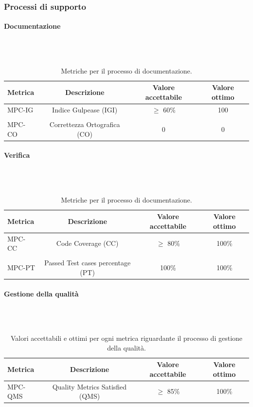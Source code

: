 \documentclass[8pt]{article}
\newcommand{\subsubsubsection}[1]{\paragraph{#1}\mbox{}\\\\}
\begin{document}
\subsubsection{Processi di supporto}
\subsubsubsection{Documentazione}
\begin{table}[h]	
	\centering
	\begin{tabular}{lccc}
		\toprule
		\textbf{Metrica}& \textbf{Descrizione} & \textbf{Valore accettabile} & \textbf{Valore ottimo} \\
		\midrule
		MPC-IG & Indice Gulpease (IGI) & $\geq$ 60\% & 100 \\\\
		MPC-CO & Correttezza Ortografica (CO) & 0 & 0 \\
		\bottomrule
	\end{tabular}
	\caption{Metriche per il processo di documentazione.}
	\label{table:Tabella delle metriche per il processo di documentazione}
\end{table}
\subsubsubsection{Verifica}
\begin{table}[h]	
	\centering
	\begin{tabular}{lccc}
		\toprule
		\textbf{Metrica}& \textbf{Descrizione} & \textbf{Valore accettabile} & \textbf{Valore ottimo} \\
		\midrule
		MPC-CC & Code Coverage (CC) & $\geq$ 80\% & 100\% \\\\
		MPC-PT & Passed Test cases percentage (PT) & 100\% & 100\% \\
		\bottomrule
	\end{tabular}
	\caption{Metriche per il processo di documentazione.}
	\label{table:Tabella delle metriche per il processo di documentazione}
\end{table}
\subsubsubsection{Gestione della qualità}
\begin{table}[H]	
	\centering
	\begin{tabular}{lccc}
		\toprule
		\textbf{Metrica}& \textbf{Descrizione} & \textbf{Valore accettabile} & \textbf{Valore ottimo} \\
		\midrule
		MPC-QMS & Quality Metrics Satisfied (QMS) & $\geq$ 85\%& 100\%\\
		\bottomrule
	\end{tabular}
	\caption{Valori accettabili e ottimi per ogni metrica riguardante il processo di gestione della qualità.}
	\label{table:Valori accettabili e ottimi per ogni metrica riguardante il processo di gestione della qualità.}
\end{table}
\clearpage
\end{document}
